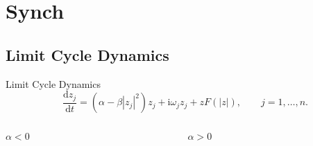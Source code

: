 \documentclass[10pt,reqno]{beamer}
\newcommand{\D}[2]{\frac{\mathrm{d} #1}{\mathrm{d} #2}}
\newcommand{\I}{\mathrm{i}}
\begin{document}
\section{Synch}
\subsection{Limit Cycle Dynamics}
\begin{frame}{Limit Cycle Dynamics}
\[
\quad \D{z_j}{t} = (\alpha - \beta|z_j|^2)z_j + \I\omega_jz_j +zF(|z|), \qquad j = 1,\ldots, n.
\]
\vfill
\begin{columns}
\begin{column}{.49\textwidth}
	\centering $\alpha <0$
	\begin{figure}
	\end{figure}
\end{column}
\begin{column}{.49\textwidth}
\begin{tcolorbox}[notitle, boxrule=1pt, colback=white]
	\centering
	$\alpha >0$
	\begin{figure}
	\end{figure}
\end{tcolorbox}
\end{column}
\end{columns}
\end{frame}
\end{document}
